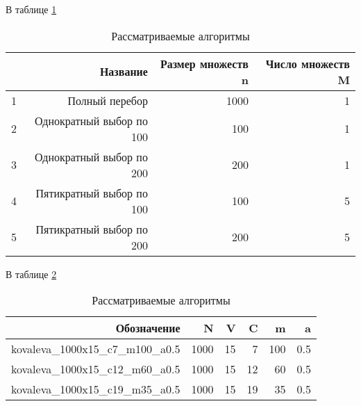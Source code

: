 \documentclass[12pt,twoside,a4paper,tikz,border=5]{refart}
\begin{document}
			В таблице \ref{tab:algorithms}
			\begin{table}[h!]
				\centering
				\caption{Рассматриваемые алгоритмы} \label{tab:algorithms}
				\begin{tabularx}{\textwidth}{|r|r|r|r|}
					\hline
					\textnumero & Название                & Размер множеств n    & Число множеств M \\ \hline
					 1  & Полный перебор           & 1000 & 1 \\ \hline
   					 2  & Однократный выбор по 100 & 100  & 1 \\ \hline
					 3  & Однократный выбор по 200 & 200  & 1 \\ \hline
					 4  & Пятикратный выбор по 100 & 100  & 5 \\  \hline
					 5  & Пятикратный выбор по 200 & 200  & 5 \\  \hline					
				\end{tabularx}
			\end{table}		
			
			В таблице \ref{tab:datasets} 
			\begin{table}[h!]
				\centering
				\caption{Рассматриваемые алгоритмы} \label{tab:datasets}
				\begin{tabularx}{\textwidth}{|r|r|r|r|r|r|}
					\hline
					Обозначение               & N & V & C & m & a\\ \hline
					kovaleva\_1000x15\_c7\_m100\_a0.5 & 1000 & 15 & 7 & 100 & 0.5\\ \hline
					kovaleva\_1000x15\_c12\_m60\_a0.5 & 1000 & 15 & 12 & 60 & 0.5\\ \hline
					kovaleva\_1000x15\_c19\_m35\_a0.5 & 1000 & 15 & 19 & 35 & 0.5\\ \hline
				\end{tabularx}							
			\end{table}
\end{document}
